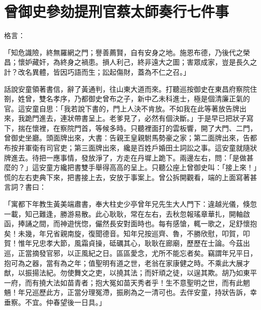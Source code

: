 %

\chapter{曾御史參劾提刑官\KG 蔡太師奏行七件事}


\begin{showcontents}{}



格言：

「知危識險，終無羅網之門；譽善薦賢，自有安身之地。施恩布德，乃後代之榮昌；懷妒藏奸，為終身之禍患。損人利己，終非遠大之圖；害眾成家，豈是長久之計？改名異體，皆因巧語而生；訟起傷財，蓋為不仁之召。」

話說安童領著書信，辭了黃通判，往山東大道而來。打聽巡按御史在東昌府察院住劄，姓曾，雙名孝序，乃都御史曾布之子，新中乙未科進士，極是個清廉正氣的官。這安童自思：「我若說下書的，門上人決不肯放。不如我在此等著放告牌出來，我跪門進去，連狀帶書呈上。老爹見了，必然有個決斷。」于是早已把狀子寫下，揣在懷裡，在察院門首，等候多時。只聽裡面打的雲板響，開了大門、二門，曾御史坐廳。頭面牌出來，大書：告親王皇親駙馬勢豪之家；第二面牌出來，告都布按并軍衛有司官吏；第三面牌出來，纔是百姓戶婚田土詞訟之事。這安童就隨狀牌進去。待把一應事情，發放淨了，方走在丹墀上跪下。兩邊左右，問：「是做甚麼的？」這安童方纔把書雙手舉得高高的呈上。只聽公座上曾御史叫：「接上來！」慌的左右吏典下來，把書接上去，安放于事案上。曾公拆開觀看，端的上面寫著甚言詞？書曰：

「寓都下年教生黃美端肅書，奉大柱史少亭曾年兄先生大人門下：違越光儀，倏忽一載，知己難逢，勝游易散。此心耿耿，常在左右，去秋忽報瑤章華扎，開軸啟函，捧誦之間，而神遊恍惚，儼然長安對面時也。每有感愴，輒一歌之，足舒懷抱矣！未幾，年兄省親南旋，復聞德音。知年兄按巡齊、魯，不勝欣慰，叩賀，叩賀！惟年兄忠孝大節，風霜貞操，砥礪其心，耿耿在廊廟，歷歷在士論。今茲出巡，正當摘發官邪，以正風紀之日。區區愛念，尤所不能忘者矣。竊謂年兄平日，抱可為之器，當有為之年；值聖明有道之世，老翁在家康健之時。不乘此大展才猷，以振揚法紀。勿使舞文之吏，以撓其法；而奸頑之徒，以逞其欺。胡乃如東平一府，而有撓大法如苗青者；抱大冤如苗天秀者乎！生不意聖明之世，而有此魍魎！年兄巡歷此方，正當分理冤滯，振刷為之一清可也。去伴安童，持狀告訴，幸垂察。不宜。仲春望後一日具。」


\end{showcontents}
